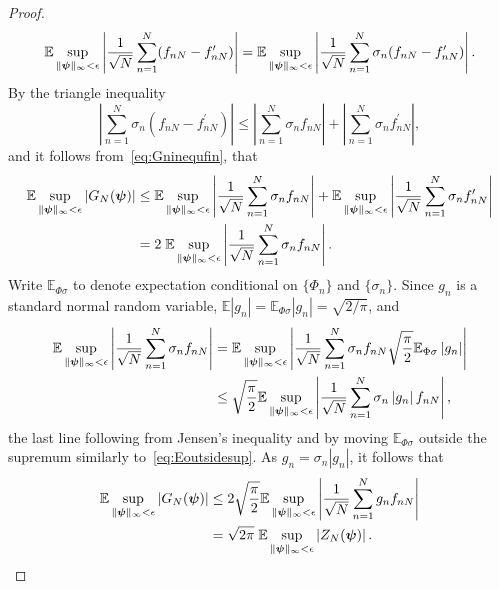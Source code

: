 \documentclass[aap]{imsart}
\newcommand{\expect}{{\mathbb E}}
\newcommand{\abs}[1]{\left\vert #1 \right\vert}
\begin{document}
\begin{proof}
\begin{align*}
 \expect \sup_{\|\psibf\|_{\infty} < \epsilon}  \abs{  \frac{1}{\sqrt{N}}\sum_{n=1}^{N}  (f_{nN} - f_{nN}^\prime) } = \expect \sup_{\|\psibf\|_{\infty} < \epsilon}  \abs{  \frac{1}{\sqrt{N}}\sum_{n=1}^{N} \sigma_n ( f_{nN} - f_{nN}^\prime) }.
\end{align*}
By the triangle inequality
\[
\abs{ \sum_{n=1}^{N} \sigma_n (f_{nN} - f_{nN}^\prime)} \leq \abs{ \sum_{n=1}^{N} \sigma_n f_{nN} } + \abs{ \sum_{n=1}^{N}  \sigma_n f_{nN}^\prime },
\]
and it follows from~\eqref{eq:Gninequfin}, that
\begin{align*}
 \expect \sup_{\|\psibf\|_{\infty} < \epsilon} \abs{ G_N(\psibf)} &\leq \expect \sup_{\|\psibf\|_{\infty} < \epsilon}  \abs{ \frac{1}{\sqrt{N}}\sum_{n=1}^{N} \sigma_n f_{nN} } + \expect \sup_{\|\psibf\|_{\infty} < \epsilon}  \abs{\frac{1}{\sqrt{N}} \sum_{n=1}^{N}  \sigma_n  f_{nN}^\prime } \\
&= 2 \; \expect \sup_{\|\psibf\|_{\infty} < \epsilon}  \abs{ \frac{1}{\sqrt{N}}\sum_{n=1}^{N} \sigma_n f_{nN} }.
\end{align*}
Write $\expect_{\Phi\sigma}$ to denote expectation conditional on $\{\Phi_n\}$ and $\{\sigma_n\}$.  Since $g_n$ is a standard normal random variable, $\expect \abs{g_n} = \expect_{\Phi\sigma} \abs{g_n} = \sqrt{2/\pi}$, and
\begin{align*}
\expect \sup_{\|\psibf\|_{\infty} < \epsilon}  \abs{ \frac{1}{\sqrt{N}}\sum_{n=1}^{N} \sigma_n f_{nN} } &= \expect \sup_{\|\psibf\|_{\infty} < \epsilon}  \abs{ \frac{1}{\sqrt{N}}\sum_{n=1}^{N} \sigma_n f_{nN} \sqrt{\frac{\pi}{2}}\expect_{\Phi\sigma} \abs{g_n}} \\
&\leq \sqrt{\frac{\pi}{2}} \expect \sup_{\|\psibf\|_{\infty} < \epsilon}  \abs{ \frac{1}{ \sqrt{N}}\sum_{n=1}^{N} \sigma_n \abs{g_n}  f_{nN}},
\end{align*}
the last line following from Jensen's inequality and by moving $\expect_{\Phi\sigma}$ outside the supremum similarly to~\eqref{eq:Eoutsidesup}. As $g_n = \sigma_n \abs{g_n}$, it follows that
\begin{align*}
\expect \sup_{\|\psibf\|_{\infty} < \epsilon} \abs{G_N(\psibf)}  &\leq 2\sqrt{\frac{\pi}{2}} \expect \sup_{\|\psibf\|_{\infty} < \epsilon}  \abs{ \frac{1}{\sqrt{N}}\sum_{n=1}^{N} g_n  f_{nN}} \\
&= \sqrt{2\pi} \; \expect \sup_{\|\psibf\|_{\infty} < \epsilon}  \abs{ Z_N(\psibf) } .
\end{align*}
\end{proof}
 
\end{document}
